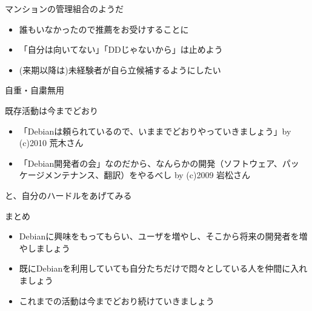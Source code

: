 \begin{frame}{マンションの管理組合のようだ}
 \begin{itemize}
  \item 誰もいなかったので推薦をお受けすることに
  \item 「自分は向いてない」「DDじゃないから」は止めよう
  \item (来期以降は)未経験者が自ら立候補するようにしたい
 \end{itemize}
 \begin{center}
  {\Huge 自重・自粛無用}
 \end{center}
\end{frame}

\begin{frame}{既存活動は今までどおり}
 \begin{itemize}
  \item  「Debianは頼られているので、いままでどおりやっていきましょう」by (c)2010 荒木さん
  \item 「Debian開発者の会」なのだから、なんらかの開発（ソフトウェア、パッ
	ケージメンテナンス、翻訳）をやるべし by (c)2009 岩松さん
 \end{itemize}
 \begin{center}
  {\Large と、自分のハードルをあげてみる}
 \end{center}
\end{frame}

\begin{frame}{まとめ}
\begin{itemize}
 \item Debianに興味をもってもらい、ユーザを増やし、そこから将来の開発者を増やしましょう
 \item 既にDebianを利用していても自分たちだけで悶々としている人を仲間に入れましょう
 \item これまでの活動は今までどおり続けていきましょう
\end{itemize}
\end{frame}

